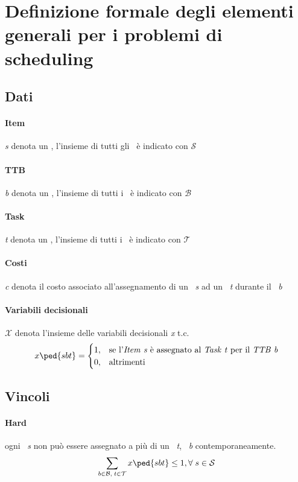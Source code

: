 \section{Definizione formale degli elementi generali per i problemi di scheduling}
    \subsection{Dati}
        \paragraph{Item} \textit{s} denota un \items, l'insieme di tutti gli \items\ è indicato con $\mathcal{S}$
        \paragraph{TTB} \textit{b} denota un \ttb, l'insieme di tutti i \ttb\ è indicato con $\mathcal{B}$
        \paragraph{Task} \textit{t} denota un \task, l'insieme di tutti i \task\ è indicato con $\mathcal{T}$
        \paragraph{Costi} \textit{c} denota il costo associato all'assegnamento di un \items\ \textit{s} ad un \task\ \textit{t} durante il \ttb\ \textit{b}
        \paragraph{Variabili decisionali} $\mathcal{X}$ denota l'insieme delle variabili decisionali \textit{x} t.c.
        \[
        x\ped{sbt} = \begin{cases}
            1,& \text{se l'\items\ \textit{s} è assegnato al \task\ \textit{t} per il \ttb\ \textit{b}}  \\
            0,& \text{altrimenti}
        \end{cases}
        \]
    \subsection{Vincoli}
        \paragraph{Hard} ogni \items\ \textit{s} non può essere assegnato a più di un \task\ \textit{t}, \ttb\ \textit{b} contemporaneamente. \[\sum_{b\in \mathcal{B},\; t\in \mathcal{T}} x\ped{sbt} \le 1, \forall \; s \in \mathcal{S} \]
